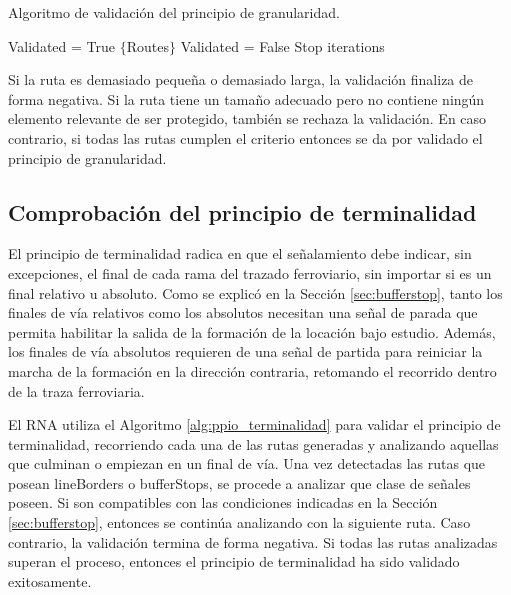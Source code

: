 		\begin{algorithm}[H]
			\caption{Algoritmo de validación del principio de granularidad.}\label{alg:ppio_granularidad}
			\DontPrintSemicolon
			\SetNoFillComment
			\LinesNotNumbered 
			Validated = True\;
			$\{$Routes$\}$\; 
			{
				{
					Validated = False\; 
					Stop iterations\;
				}				
			}
		\end{algorithm}
		
		Si la ruta es demasiado pequeña o demasiado larga, la validación finaliza de forma negativa. Si la ruta tiene un tamaño adecuado pero no contiene ningún elemento relevante de ser protegido, también se rechaza la validación. En caso contrario, si todas las rutas cumplen el criterio entonces se da por validado el principio de granularidad.
		
	\subsection{Comprobación del principio de terminalidad}
		
		El principio de terminalidad radica en que el señalamiento debe indicar, sin excepciones, el final de cada rama del trazado ferroviario, sin importar si es un final relativo u absoluto. Como se explicó en la Sección \ref{sec:bufferstop}, tanto los finales de vía relativos como los absolutos necesitan una señal de parada que permita habilitar la salida de la formación de la locación bajo estudio. Además, los finales de vía absolutos requieren de una señal de partida para reiniciar la marcha de la formación en la dirección contraria, retomando el recorrido dentro de la traza ferroviaria.	
		
		El RNA utiliza el Algoritmo \ref{alg:ppio_terminalidad} para validar el principio de terminalidad, recorriendo cada una de las rutas generadas y analizando aquellas que culminan o empiezan en un final de vía. Una vez detectadas las rutas que posean lineBorders o bufferStops, se procede a analizar que clase de señales poseen. Si son compatibles con las condiciones indicadas en la Sección \ref{sec:bufferstop}, entonces se continúa analizando con la siguiente ruta. Caso contrario, la validación termina de forma negativa. Si todas las rutas analizadas superan el proceso, entonces el principio de terminalidad ha sido validado exitosamente.
		
